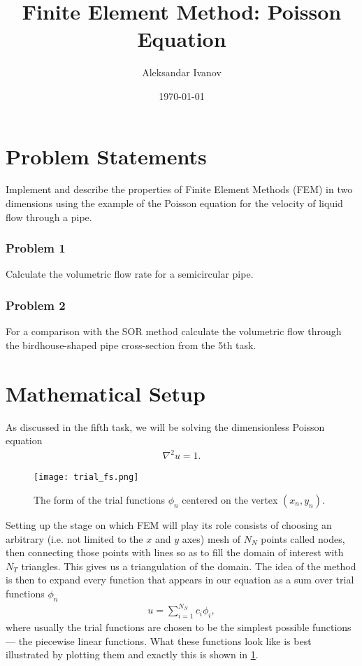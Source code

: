\documentclass[10pt,a4paper,twocolumn]{article}
\begin{document}
\title{Finite Element Method: Poisson Equation}
\author{Aleksandar Ivanov}
\date{\today}
\maketitle

\section{Problem Statements}

Implement and describe the properties of Finite Element Methods (FEM) in two dimensions using the example of the Poisson equation for the velocity of liquid flow through a pipe.

\subsubsection*{Problem 1}

Calculate the volumetric flow rate for a semicircular pipe.

\subsubsection*{Problem 2}

For a comparison with the SOR method calculate the volumetric flow through the birdhouse-shaped pipe cross-section from the 5th task.

\section{Mathematical Setup}

As discussed in the fifth task, we will be solving the dimensionless Poisson equation
%
\begin{align}
    \nabla^2 u = 1.
\end{align}

\begin{figure}[!h]
    \centering
    \texttt{[image: trial\_fs.png]}
    \caption{The form of the trial functions $\phi_n$ centered on the vertex $(x_n, y_n)$.}
    \label{fig:pyramids}
\end{figure}

Setting up the stage on which FEM will play its role consists of choosing an arbitrary (i.e. not limited to the $x$ and $y$ axes) mesh of $N_N$ points called nodes, then connecting those points with lines so as to fill the domain of interest with $N_T$ triangles. This gives us a triangulation of the domain. The idea of the method is then to expand every function that appears in our equation as a sum over trial functions $\phi_n$
%
\begin{align}
    u = \sum_{i=1}^{N_N} c_i \phi_i,
\end{align}
%
where usually the trial functions are chosen to be the simplest possible functions --- the piecewise linear functions. What these functions look like is best illustrated by plotting them and exactly this is shown in \cref{fig:pyramids}.
\end{document}
